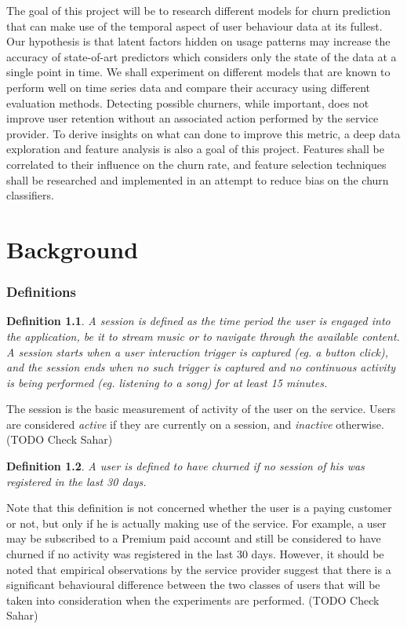 \documentclass{kththesis}
\begin{document}
The goal of this project will be to research different models for churn prediction that can make use of the temporal aspect of user behaviour data at its fullest. Our hypothesis is that latent factors hidden on usage patterns may increase the accuracy of state-of-art predictors which considers only the state of the data at a single point in time. We shall experiment on different models that are known to perform well on time series data and compare their accuracy using different evaluation methods. Detecting possible churners, while important, does not improve user retention without an associated action performed by the service provider. To derive insights on what can done to improve this metric, a deep data exploration and feature analysis is also a goal of this project. Features shall be correlated to their influence on the churn rate, and feature selection techniques shall be researched and implemented in an attempt to reduce bias on the churn classifiers.    

\chapter{Background}

\subsection{Definitions}

\newtheorem{definition}{Definition}

\begin{definition}
A \emph{session} is defined as the time period the user is engaged into the application, be it to stream music or to navigate through the available content. A session starts when a user interaction trigger is captured (eg. a button click), and the session ends when no such trigger is captured and no continuous activity is being performed (eg. listening to a song) for at least 15 minutes.
\end{definition}

The session is the basic measurement of activity of the user on the service. Users are considered \emph{active} if they are currently on a session, and \emph{inactive} otherwise. (TODO Check Sahar)

\begin{definition}
A user is defined to have \emph{churned} if no session of his was registered in the last 30 days.
\end{definition}

Note that this definition is not concerned whether the user is a paying customer or not, but only if he is actually making use of the service. For example, a user may be subscribed to a Premium paid account and still be considered to have churned if no activity was registered in the last 30 days. However, it should be noted that empirical observations by the service provider suggest that there is a significant behavioural difference between the two classes of users that will be taken into consideration when the experiments are performed. (TODO Check Sahar)
\end{document}
